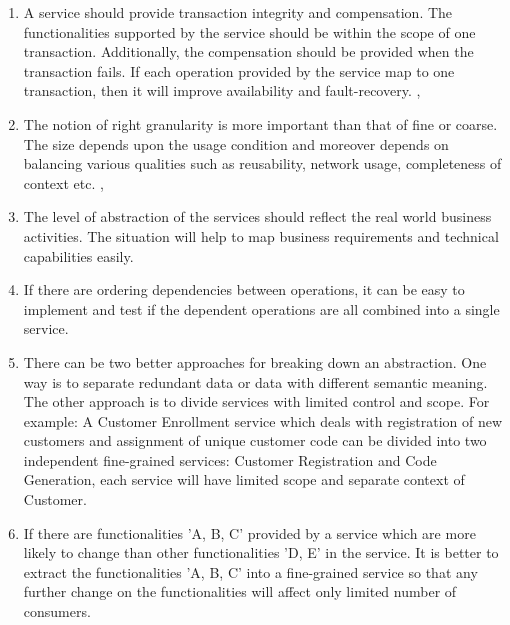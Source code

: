 \begin{enumerate}
\item A service should provide transaction integrity and compensation. The functionalities supported by the service should be within the scope of one transaction. Additionally, the compensation should be provided when the transaction fails. If each operation provided by the service map to one transaction, then it will improve availability and fault-recovery. \cite{Raf-Haesen:2015aa}, \cite{Foody:2005aa} \cite{Bianco:2007aa}

\item The notion of right granularity is more important than that of fine or coarse. The size depends upon the usage condition and moreover depends on balancing various qualities such as reusability, network usage, completeness of context etc. \cite{Raf-Haesen:2015aa}, \cite{Lawrence-Wilkes:2004aa}

\item The level of abstraction of the services should reflect the real world business activities. The situation will help to map business requirements and technical capabilities easily. \cite{Pierre-Reldin:2007aa}

\item If there are ordering dependencies between operations, it can be easy to implement and test if the dependent operations are all combined into a single service. \cite{Bianco:2007aa}

\item There can be two better approaches for breaking down an abstraction. One way is to separate redundant data or data with different semantic meaning. The other approach is to divide services with limited control and scope. For example: A Customer Enrollment service which deals with registration of new customers and assignment of unique customer code can be divided into two independent fine-grained services: Customer Registration and Code Generation, each service will have limited scope and separate context of Customer.\cite{Pierre-Reldin:2007aa}

\item If there are functionalities 'A, B, C' provided by a service which are more likely to change than other functionalities 'D, E' in the service. It is better to extract the functionalities 'A, B, C' into a fine-grained service so that any further change on the functionalities will affect only limited number of consumers. \cite{Bianco:2007aa}
 
\end{enumerate}

